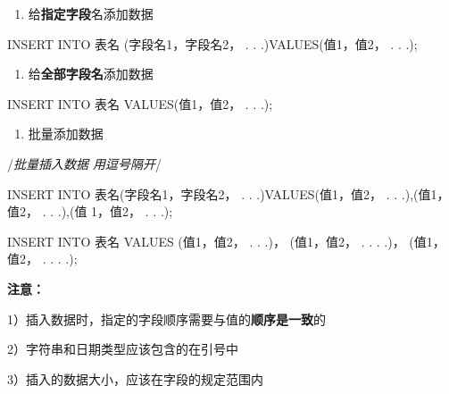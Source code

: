 \documentclass[
  letterpaper,
  DIV=11,
  numbers=noendperiod]{scrreprt}
\newenvironment{Shaded}{\begin{snugshade}}{\end{snugshade}}
\newcommand{\KeywordTok}[1]{\textcolor[rgb]{0.00,0.23,0.31}{#1}}
\newcommand{\NormalTok}[1]{\textcolor[rgb]{0.00,0.23,0.31}{#1}}
\providecommand{\tightlist}{%
  \setlength{\itemsep}{0pt}\setlength{\parskip}{0pt}}\usepackage{longtable,booktabs,array}
\begin{document}
\begin{enumerate}
\def\labelenumi{\arabic{enumi}.}
\tightlist
\item
  给\textbf{指定字段}名添加数据
\end{enumerate}

\begin{Shaded}
\begin{Highlighting}[]
\KeywordTok{INSERT} \KeywordTok{INTO}\NormalTok{ 表名  (字段名1，字段名2， . . .)}\KeywordTok{VALUES}\NormalTok{(值1，值2， . . .);}
\end{Highlighting}
\end{Shaded}

\begin{enumerate}
\def\labelenumi{\arabic{enumi}.}
\setcounter{enumi}{1}
\tightlist
\item
  给\textbf{全部字段名}添加数据
\end{enumerate}

\begin{Shaded}
\begin{Highlighting}[]
\KeywordTok{INSERT} \KeywordTok{INTO}\NormalTok{ 表名 }\KeywordTok{VALUES}\NormalTok{(值1，值2， . . .);}
\end{Highlighting}
\end{Shaded}

\begin{enumerate}
\def\labelenumi{\arabic{enumi}.}
\setcounter{enumi}{2}
\tightlist
\item
  批量添加数据
\end{enumerate}

/\emph{批量插入数据 用逗号隔开}/

\begin{Shaded}
\begin{Highlighting}[]
\KeywordTok{INSERT} \KeywordTok{INTO}\NormalTok{ 表名(字段名1，字段名2， . . .)}\KeywordTok{VALUES}\NormalTok{(值1，值2， . . .),(值1，值2， . . .),(值 1，值2， . . .);}

\KeywordTok{INSERT} \KeywordTok{INTO}\NormalTok{ 表名 }\KeywordTok{VALUES}\NormalTok{ (值1，值2， . . .)， (值1，值2， . . . .)， (值1，值2， . . . .);}
\end{Highlighting}
\end{Shaded}

\textbf{注意：}

1）插入数据时，指定的字段顺序需要与值的\textbf{顺序是一致}的

2）字符串和日期类型应该包含的在引号中

3）插入的数据大小，应该在字段的规定范围内
\end{document}
